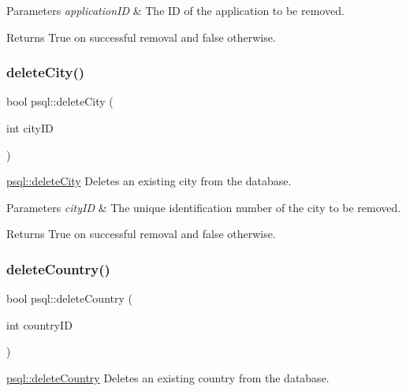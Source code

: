 \begin{DoxyParams}{Parameters}
{\em application\+ID} & The ID of the application to be removed. \\
\hline
\end{DoxyParams}
\begin{DoxyReturn}{Returns}
True on successful removal and false otherwise. 
\end{DoxyReturn}
\mbox{\label{classpsql_aaffd42b26b635d9881daaf5fbf4fd62f}} 
\subsubsection{\texorpdfstring{delete\+City()}{deleteCity()}}
{\footnotesize\ttfamily bool psql\+::delete\+City (\begin{DoxyParamCaption}\item[{int}]{city\+ID }\end{DoxyParamCaption})}



\mbox{\hyperlink{classpsql_aaffd42b26b635d9881daaf5fbf4fd62f}{psql\+::delete\+City}} Deletes an existing city from the database. 


\begin{DoxyParams}{Parameters}
{\em city\+ID} & The unique identification number of the city to be removed. \\
\hline
\end{DoxyParams}
\begin{DoxyReturn}{Returns}
True on successful removal and false otherwise. 
\end{DoxyReturn}
\mbox{\label{classpsql_a914bf8701fbed4ff80edcd0d09c7c3fd}} 
\subsubsection{\texorpdfstring{delete\+Country()}{deleteCountry()}}
{\footnotesize\ttfamily bool psql\+::delete\+Country (\begin{DoxyParamCaption}\item[{int}]{country\+ID }\end{DoxyParamCaption})}



\mbox{\hyperlink{classpsql_a914bf8701fbed4ff80edcd0d09c7c3fd}{psql\+::delete\+Country}} Deletes an existing country from the database. 


